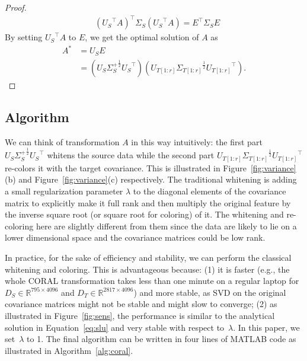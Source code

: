 \documentclass[letterpaper]{article}
\begin{document}
\begin{proof}
\begin{align*}
&{({U_S}^{\top}A)}^{\top}{\Sigma_S}({U_S}^{\top}{A})= {E}^{\top}{\Sigma_S}E
\end{align*}
By setting ${U_S}^{\top}A$ to $E$, we get the optimal solution of $A$ as
\begin{equation}
\begin{aligned}
A^{*}&={U_S}E\\
&=(U_{S}{\Sigma_S^{+}}^{\frac{1}{2}}{U_{S}}^{\top})(U_{T[1:r]}{\Sigma_{T[1:r]}}^{\frac{1}{2}}{U_{T[1:r]}}^{\top}).%
 \end{aligned}
\label{eq:slu}
\end{equation}
\end{proof}

\subsection{Algorithm}
\label{subsec:algo}
We can think of transformation $A$ in this way intuitively: the first part $U_{S}{\Sigma_S^{+}}^{\frac{1}{2}}{U_{S}}^{\top}$ whitens the source data while the second part $U_{T[1:r]}{\Sigma_{T[1:r]}}^{\frac{1}{2}}{U_{T[1:r]}}^{\top}$ re-colors it with the target covariance. This is illustrated in Figure~\ref{fig:variance}(b) and Figure~\ref{fig:variance}(c) respectively. The traditional whitening is adding a small regularization parameter $\lambda$ to the diagonal elements of the covariance matrix to explicitly make it full rank and then multiply the original feature by the inverse square root (or square root for coloring) of it. The whitening and re-coloring here are slightly different from them since the data are likely to lie on a lower dimensional space and the covariance matrices could be low rank.

In practice, for the sake of efficiency and stability, we can perform the classical whitening and coloring. This is advantageous because: (1)
it is faster (e.g., the whole CORAL transformation takes less than one minute on a regular laptop for $D_S\in\mathbb{R}^{795\times4096}$ and $D_T\in\mathbb{R}^{2817\times4096}$) and more stable, as SVD on the original covariance matrices might not be stable and might slow to converge; (2) as illustrated in Figure~\ref{fig:sens}, the performance is similar to the analytical solution in Equation~\eqref{eq:slu} and very stable with respect to~$\lambda$. In this paper, we set~$\lambda$ to 1. The final algorithm can be written in four lines of MATLAB code as illustrated in Algorithm~\ref{alg:coral}.
\end{document}

